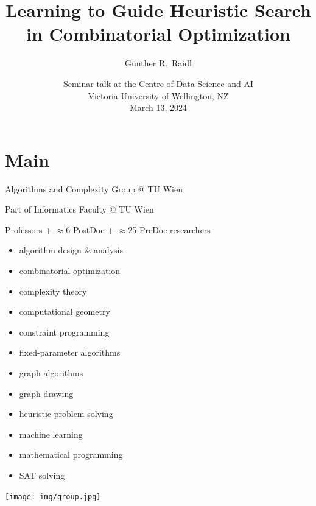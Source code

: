 \documentclass[aspectratio=1610]{beamer}
\title{Learning to Guide Heuristic Search in Combinatorial Optimization}
\author{Günther R.\ Raidl}
\date{Seminar talk at the Centre of Data Science and AI\\ Victoria University of Wellington, NZ\\March 13, 2024}
\institute[]{Algorithms and Complexity Group, TU Wien, Austria,\\
    raidl@ac.tuwien.ac.at\\[1ex]
}
\begin{document}
{}


\part{Main}

\begin{frame}
  \titlepage
\end{frame}


\begin{frame}{Algorithms and Complexity Group @ TU Wien}

Part of Informatics Faculty @ TU Wien

 Professors + $\approx$6 PostDoc + $\approx$25 PreDoc researchers 

\medskip
{}

\medskip
\begin{minipage}{0.4\textwidth}
  \begin{itemize}
      \item algorithm design \& analysis
      \item combinatorial optimization
      \item complexity theory
      \item computational geometry
      \item constraint programming
      \item fixed-parameter algorithms
  \end{itemize}
\end{minipage}\qquad
\begin{minipage}{0.4\textwidth}
  \begin{itemize}
      \item graph algorithms
      \item graph drawing
      \item heuristic problem solving
      \item machine learning
      \item mathematical programming
      \item SAT solving
    \end{itemize}
  \end{minipage}

  \bigskip
  \texttt{[image: img/group.jpg]}
\end{frame}
\end{document}
